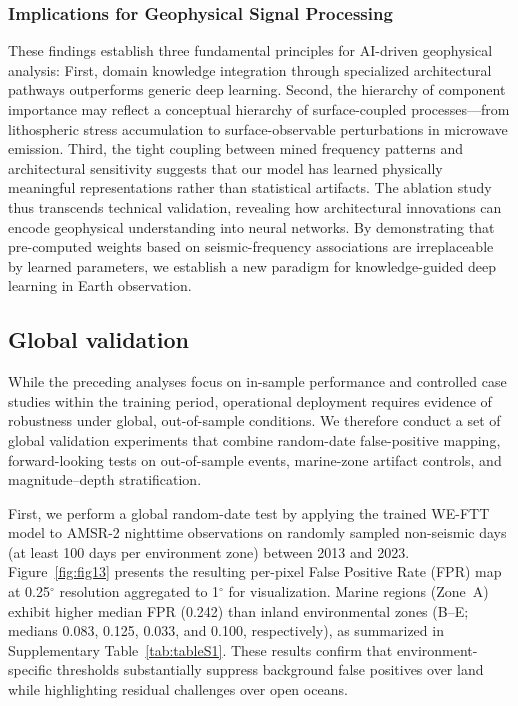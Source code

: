 \documentclass[preprint,review,12pt,authoryear]{elsarticle}
\begin{document}
\subsubsection{Implications for Geophysical Signal Processing} 
These findings establish three fundamental principles for AI-driven geophysical analysis: First, domain knowledge integration through specialized architectural pathways outperforms generic deep learning. Second, the hierarchy of component importance may reflect a conceptual hierarchy of surface-coupled processes---from lithospheric stress accumulation to surface-observable perturbations in microwave emission. Third, the tight coupling between mined frequency patterns and architectural sensitivity suggests that our model has learned physically meaningful representations rather than statistical artifacts.
The ablation study thus transcends technical validation, revealing how architectural innovations can encode geophysical understanding into neural networks. By demonstrating that pre-computed weights based on seismic-frequency associations are irreplaceable by learned parameters, we establish a new paradigm for knowledge-guided deep learning in Earth observation.

\subsection{Global validation}
While the preceding analyses focus on in-sample performance and controlled case studies within the training period, operational deployment requires evidence of robustness under global, out-of-sample conditions. We therefore conduct a set of global validation experiments that combine random-date false-positive mapping, forward-looking tests on out-of-sample events, marine-zone artifact controls, and magnitude--depth stratification.

First, we perform a global random-date test by applying the trained WE-FTT model to AMSR-2 nighttime observations on randomly sampled non-seismic days (at least 100 days per environment zone) between 2013 and 2023. Figure~\ref{fig:fig13} presents the resulting per-pixel False Positive Rate (FPR) map at 0.25$^{\circ}$ resolution aggregated to 1$^{\circ}$ for visualization. Marine regions (Zone~A) exhibit higher median FPR (0.242) than inland environmental zones (B--E; medians 0.083, 0.125, 0.033, and 0.100, respectively), as summarized in Supplementary Table~\ref{tab:tableS1}. These results confirm that environment-specific thresholds substantially suppress background false positives over land while highlighting residual challenges over open oceans.
\end{document}
